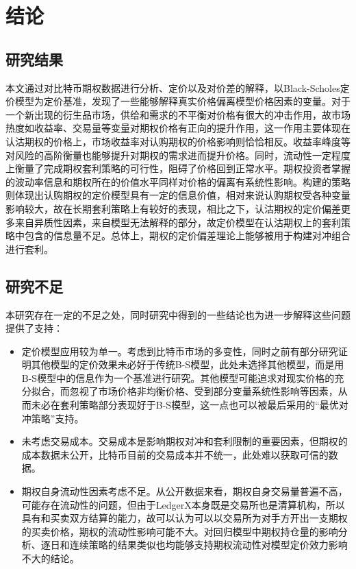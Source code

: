 \chapter{结论}
\section{研究结果}
本文通过对比特币期权数据进行分析、定价以及对价差的解释，以Black-Scholes定价模型为定价基准，发现了一些能够解释真实价格偏离模型价格因素的变量。对于一个新出现的衍生品市场，供给和需求的不平衡对价格有很大的冲击作用，故市场热度如收益率、交易量等变量对期权价格有正向的提升作用，这一作用主要体现在认沽期权的价格上，市场收益率对认购期权的价格影响则恰恰相反。收益率峰度等对风险的高阶衡量也能够提升对期权的需求进而提升价格。同时，流动性一定程度上衡量了完成期权套利策略的可行性，阻碍了价格回到正常水平。期权投资者掌握的波动率信息和期权所在的价值水平同样对价格的偏离有系统性影响。构建的策略则体现出认购期权的定价模型具有一定的信息价值，相对来说认购期权受各种变量影响较大，故在长期套利策略上有较好的表现，相比之下，认沽期权的定价偏差更多来自异质性因素，来自模型无法解释的部分，故定价模型在认沽期权上的套利策略中包含的信息量不足。总体上，期权的定价偏差理论上能够被用于构建对冲组合进行套利。
\section{研究不足}
本研究存在一定的不足之处，同时研究中得到的一些结论也为进一步解释这些问题提供了支持：
\begin{itemize}
    \item 定价模型应用较为单一。考虑到比特币市场的多变性，同时之前有部分研究证明其他模型的定价效果未必好于传统B-S模型，此处未选择其他模型，而是用B-S模型中的信息作为一个基准进行研究。其他模型可能追求对现实价格的充分拟合，而忽视了市场价格非均衡价格、受到部分变量系统性影响等因素，从而未必在套利策略部分表现好于B-S模型，这一点也可以被最后采用的“最优对冲策略”支持。
    \item 未考虑交易成本。交易成本是影响期权对冲和套利限制的重要因素，但期权的成本数据未公开，比特币目前的交易成本并不统一，此处难以获取可信的数据。
    \item 期权自身流动性因素考虑不足。从公开数据来看，期权自身交易量普遍不高，可能存在流动性的问题，但由于LedgerX本身既是交易所也是清算机构，所以具有和买卖双方结算的能力，故可以认为可以以交易所为对手方开出一支期权的买卖价格，期权的流动性影响可能不大。对回归模型中期权持仓量的影响分析、逐日和连续策略的结果类似也均能够支持期权流动性对模型定价效力影响不大的结论。
\end{itemize}